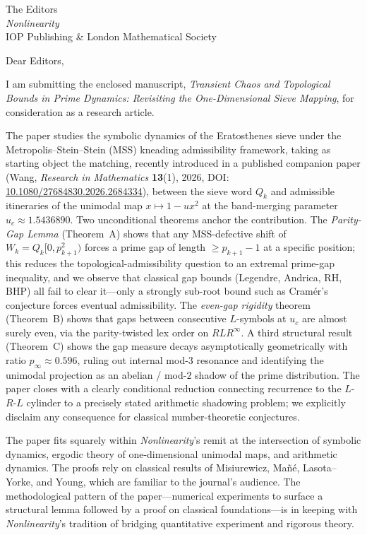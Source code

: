 \documentclass[11pt,a4paper]{letter}
\begin{document}
\begin{letter}{
The Editors \\
\emph{Nonlinearity} \\
IOP Publishing \& London Mathematical Society
}

\opening{Dear Editors,}

I am submitting the enclosed manuscript, \emph{Transient Chaos and
Topological Bounds in Prime Dynamics: Revisiting the One-Dimensional
Sieve Mapping}, for consideration as a research article.

The paper studies the symbolic dynamics of the Eratosthenes sieve
under the Metropolis--Stein--Stein (MSS) kneading admissibility
framework, taking as starting object the matching, recently introduced
in a published companion paper (Wang, \emph{Research in Mathematics}
\textbf{13}(1), 2026, DOI: \href{https://doi.org/10.1080/27684830.2026.2684334}{10.1080/27684830.2026.2684334}),
between the sieve word $Q_k$ and admissible itineraries of the
unimodal map $x \mapsto 1 - u x^2$ at the band-merging parameter
$u_c \approx 1.5436890$. Two unconditional theorems anchor the
contribution. The \emph{Parity-Gap Lemma} (Theorem~A) shows that any
MSS-defective shift of $W_k = Q_k[0, p_{k+1}^2)$ forces a prime gap
of length $\geq p_{k+1} - 1$ at a specific position; this reduces
the topological-admissibility question to an extremal prime-gap
inequality, and we observe that classical gap bounds (Legendre,
Andrica, RH, BHP) all fail to clear it---only a strongly sub-root
bound such as Cram\'er's conjecture forces eventual admissibility.
The \emph{even-gap rigidity} theorem (Theorem~B) shows that gaps
between consecutive $L$-symbols at $u_c$ are almost surely even,
via the parity-twisted lex order on $RLR^\infty$. A third structural
result (Theorem~C) shows the gap measure decays asymptotically
geometrically with ratio $p_\infty \approx 0.596$, ruling out
internal mod-$3$ resonance and identifying the unimodal projection
as an abelian / mod-$2$ shadow of the prime distribution. The paper
closes with a clearly conditional reduction connecting recurrence
to the $L$-$R$-$L$ cylinder to a precisely stated arithmetic
shadowing problem; we explicitly disclaim any consequence for
classical number-theoretic conjectures.

The paper fits squarely within \emph{Nonlinearity}'s remit at the
intersection of symbolic dynamics, ergodic theory of one-dimensional
unimodal maps, and arithmetic dynamics. The proofs rely on classical
results of Misiurewicz, Ma\~n\'e, Lasota--Yorke, and Young, which are
familiar to the journal's audience. The methodological pattern of
the paper---numerical experiments to surface a structural lemma
followed by a proof on classical foundations---is in keeping with
\emph{Nonlinearity}'s tradition of bridging quantitative experiment
and rigorous theory.


\end{letter}
\end{document}
